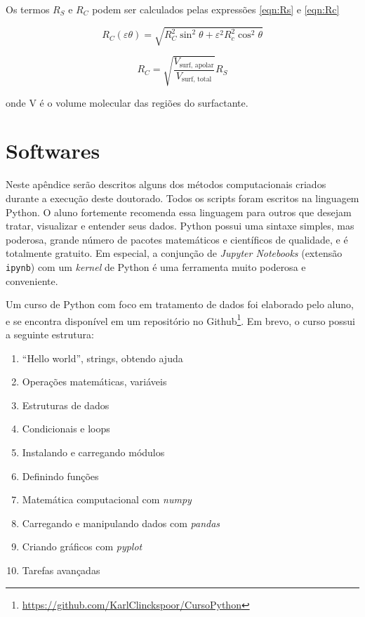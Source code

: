 \begin{apendicesenv}
	Os termos $R_S$ e $R_C$ podem ser calculados pelas expressões \ref{eqn:Rs} e \ref{eqn:Rc}
	
	\begin{equation}
	R_C(\varepsilon\theta) = \sqrt{R_C^2\sin^2\theta + \varepsilon^2R_c^2\cos^2\theta}
	\label{eqn:Rc}
	\end{equation}
	
	\begin{equation}
	R_C = \sqrt{\frac{V_{\text{surf, apolar}}}{V_{\text{surf, total}}}}R_S
	\label{eqn:Rs}
	\end{equation}
	
	\noindent onde V é o volume molecular das regiões do surfactante.
	
	
	\chapter{Softwares}
		Neste apêndice serão descritos alguns dos métodos computacionais criados durante a execução deste doutorado. Todos os scripts foram escritos na linguagem Python. O aluno fortemente recomenda essa linguagem para outros que desejam tratar, visualizar e entender seus dados. Python possui uma sintaxe simples, mas poderosa, grande número de pacotes matemáticos e científicos de qualidade, e é totalmente gratuito. Em especial, a conjunção de \emph{Jupyter Notebooks} (extensão \texttt{ipynb}) com um \emph{kernel} de Python é uma ferramenta muito poderosa e conveniente.
		
		Um curso de Python com foco em tratamento de dados foi elaborado pelo aluno, e se encontra disponível em um repositório no Github\footnote{\href{https://github.com/KarlClinckspoor/CursoPython}{https://github.com/KarlClinckspoor/CursoPython}}. Em brevo, o curso possui a seguinte estrutura:
		
		\begin{enumerate}
			\item ``Hello world'', strings, obtendo ajuda
			\item Operações matemáticas, variáveis
			\item Estruturas de dados
			\item Condicionais e loops
			\item Instalando e carregando módulos
			\item Definindo funções
			\item Matemática computacional com \emph{numpy}
			\item Carregando e manipulando dados com \emph{pandas}
			\item Criando gráficos com \emph{pyplot}
			\item Tarefas avançadas
		\end{enumerate}
		


\end{apendicesenv}
